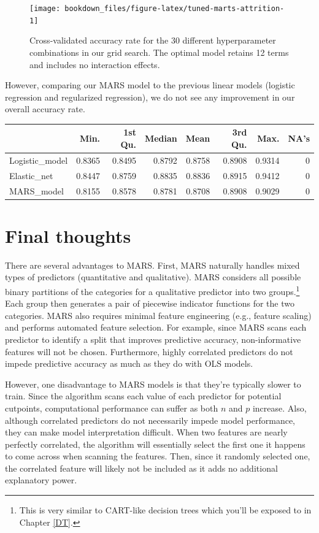 \documentclass[]{krantz}
\begin{document}
\begin{figure}

{\centering \texttt{[image: bookdown\_files/figure-latex/tuned-marts-attrition-1]} 

}

\caption{Cross-validated accuracy rate for the 30 different hyperparameter combinations in our grid search. The optimal model retains 12 terms and includes no interaction effects.}\label{fig:tuned-marts-attrition}
\end{figure}

However, comparing our MARS model to the previous linear models (logistic regression and regularized regression), we do not see any improvement in our overall accuracy rate.

\begin{tabular}{l|r|r|r|r|r|r|r}
\hline
  & Min. & 1st Qu. & Median & Mean & 3rd Qu. & Max. & NA's\\
\hline
Logistic\_model & 0.8365 & 0.8495 & 0.8792 & 0.8758 & 0.8908 & 0.9314 & 0\\
\hline
Elastic\_net & 0.8447 & 0.8759 & 0.8835 & 0.8836 & 0.8915 & 0.9412 & 0\\
\hline
MARS\_model & 0.8155 & 0.8578 & 0.8781 & 0.8708 & 0.8908 & 0.9029 & 0\\
\hline
\end{tabular}

\hypertarget{final-thoughts-3}{%
\section{Final thoughts}\label{final-thoughts-3}}

There are several advantages to MARS. First, MARS naturally handles mixed types of predictors (quantitative and qualitative). MARS considers all possible binary partitions of the categories for a qualitative predictor into two groups.\footnote{This is very similar to CART-like decision trees which you'll be exposed to in Chapter \ref{DT}.} Each group then generates a pair of piecewise indicator functions for the two categories. MARS also requires minimal feature engineering (e.g., feature scaling) and performs automated feature selection. For example, since MARS scans each predictor to identify a split that improves predictive accuracy, non-informative features will not be chosen. Furthermore, highly correlated predictors do not impede predictive accuracy as much as they do with OLS models.

However, one disadvantage to MARS models is that they're typically slower to train. Since the algorithm scans each value of each predictor for potential cutpoints, computational performance can suffer as both \(n\) and \(p\) increase. Also, although correlated predictors do not necessarily impede model performance, they can make model interpretation difficult. When two features are nearly perfectly correlated, the algorithm will essentially select the first one it happens to come across when scanning the features. Then, since it randomly selected one, the correlated feature will likely not be included as it adds no additional explanatory power.



\backmatter
\printindex
\end{document}
